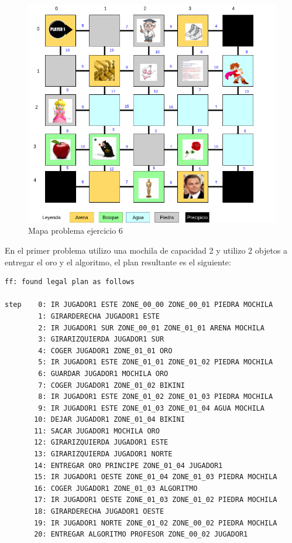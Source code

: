 \documentclass[12pt]{article}
\begin{document}
\begin{figure}[H] 
	\centering
	\includegraphics[width=15cm]{Ej6_1.png}
	\caption{Mapa problema ejercicio 6}
\end{figure}

En el primer problema utilizo una mochila de capacidad 2 y utilizo 2 objetos a entregar el oro y el algoritmo, el plan resultante es el siguiente:
\begin{verbatim}
ff: found legal plan as follows

step    0: IR JUGADOR1 ESTE ZONE_00_00 ZONE_00_01 PIEDRA MOCHILA
        1: GIRARDERECHA JUGADOR1 ESTE
        2: IR JUGADOR1 SUR ZONE_00_01 ZONE_01_01 ARENA MOCHILA
        3: GIRARIZQUIERDA JUGADOR1 SUR
        4: COGER JUGADOR1 ZONE_01_01 ORO
        5: IR JUGADOR1 ESTE ZONE_01_01 ZONE_01_02 PIEDRA MOCHILA
        6: GUARDAR JUGADOR1 MOCHILA ORO
        7: COGER JUGADOR1 ZONE_01_02 BIKINI
        8: IR JUGADOR1 ESTE ZONE_01_02 ZONE_01_03 PIEDRA MOCHILA
        9: IR JUGADOR1 ESTE ZONE_01_03 ZONE_01_04 AGUA MOCHILA
       10: DEJAR JUGADOR1 ZONE_01_04 BIKINI
       11: SACAR JUGADOR1 MOCHILA ORO
       12: GIRARIZQUIERDA JUGADOR1 ESTE
       13: GIRARIZQUIERDA JUGADOR1 NORTE
       14: ENTREGAR ORO PRINCIPE ZONE_01_04 JUGADOR1
       15: IR JUGADOR1 OESTE ZONE_01_04 ZONE_01_03 PIEDRA MOCHILA
       16: COGER JUGADOR1 ZONE_01_03 ALGORITMO
       17: IR JUGADOR1 OESTE ZONE_01_03 ZONE_01_02 PIEDRA MOCHILA
       18: GIRARDERECHA JUGADOR1 OESTE
       19: IR JUGADOR1 NORTE ZONE_01_02 ZONE_00_02 PIEDRA MOCHILA
       20: ENTREGAR ALGORITMO PROFESOR ZONE_00_02 JUGADOR1

\end{verbatim}
\end{document}
